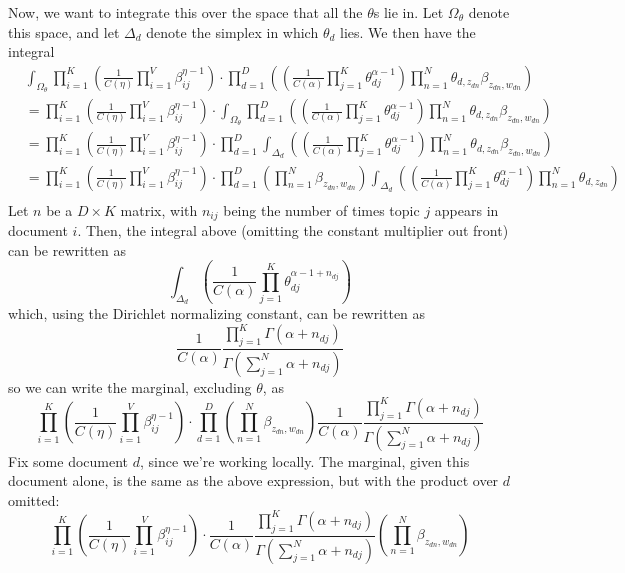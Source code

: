 \documentclass{article}
\begin{document}
Now, we want to integrate this over the space that all the $\theta$s lie in. Let $\Omega_\theta$ denote this space, and let $\Delta_d$ denote the simplex in which $\theta_d$ lies. We then have the integral
\begin{align*}
    &\int_{\Omega_\theta}\prod_{i=1}^K\left(\frac{1}{C(\eta)}\prod_{i=1}^V\beta_{ij}^{\eta-1}\right)\cdot\prod_{d=1}^D\left(\left(\frac{1}{C(\alpha)}\prod_{j=1}^K\theta_{dj}^{\alpha-1}\right)\prod_{n=1}^N\theta_{d,z_{dn}}\beta_{z_{dn},w_{dn}}\right)\\
    &=\prod_{i=1}^K\left(\frac{1}{C(\eta)}\prod_{i=1}^V\beta_{ij}^{\eta-1}\right)\cdot\int_{\Omega_\theta}\prod_{d=1}^D\left(\left(\frac{1}{C(\alpha)}\prod_{j=1}^K\theta_{dj}^{\alpha-1}\right)\prod_{n=1}^N\theta_{d,z_{dn}}\beta_{z_{dn},w_{dn}}\right)\\
    &=\prod_{i=1}^K\left(\frac{1}{C(\eta)}\prod_{i=1}^V\beta_{ij}^{\eta-1}\right)\cdot\prod_{d=1}^D\int_{\Delta_d}\left(\left(\frac{1}{C(\alpha)}\prod_{j=1}^K\theta_{dj}^{\alpha-1}\right)\prod_{n=1}^N\theta_{d,z_{dn}}\beta_{z_{dn},w_{dn}}\right)\\
    &=\prod_{i=1}^K\left(\frac{1}{C(\eta)}\prod_{i=1}^V\beta_{ij}^{\eta-1}\right)\cdot\prod_{d=1}^D\left(\prod_{n=1}^N\beta_{z_{dn},w_{dn}}\right)\int_{\Delta_d}\left(\left(\frac{1}{C(\alpha)}\prod_{j=1}^K\theta_{dj}^{\alpha-1}\right)\prod_{n=1}^N\theta_{d,z_{dn}}\right)\\
\end{align*}
Let $n$ be a $D\times K$ matrix, with $n_{ij}$ being the number of times topic $j$ appears in document $i$. Then, the integral above (omitting the constant multiplier out front) can be rewritten as
\[\int_{\Delta_d}\left(\frac{1}{C(\alpha)}\prod_{j=1}^K\theta_{dj}^{\alpha-1+n_{dj}}\right)\]
which, using the Dirichlet normalizing constant, can be rewritten as
\[\frac{1}{C(\alpha)}\frac{\prod_{j=1}^K\Gamma(\alpha+n_{dj})}{\Gamma(\sum_{j=1}^N\alpha+n_{dj})}\]
so we can write the marginal, excluding $\theta$, as
\[\prod_{i=1}^K\left(\frac{1}{C(\eta)}\prod_{i=1}^V\beta_{ij}^{\eta-1}\right)\cdot\prod_{d=1}^D\left(\prod_{n=1}^N\beta_{z_{dn},w_{dn}}\right)\frac{1}{C(\alpha)}\frac{\prod_{j=1}^K\Gamma(\alpha+n_{dj})}{\Gamma(\sum_{j=1}^N\alpha+n_{dj})}\]
Fix some document $d$, since we're working locally. The marginal, given this document alone, is the same as the above expression, but with the product over $d$ omitted:
\[\prod_{i=1}^K\left(\frac{1}{C(\eta)}\prod_{i=1}^V\beta_{ij}^{\eta-1}\right)\cdot\frac{1}{C(\alpha)}\frac{\prod_{j=1}^K\Gamma(\alpha+n_{dj})}{\Gamma(\sum_{j=1}^N\alpha+n_{dj})}\left(\prod_{n=1}^N\beta_{z_{dn},w_{dn}}\right)\]
\end{document}
